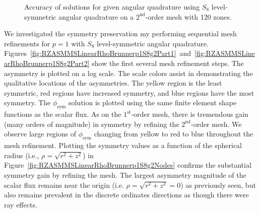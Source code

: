 \documentclass[12pt]{article}
\begin{document}
\begin{figure}[!htb]
\centering
{}
\caption{Accuracy of solutions for given angular quadrature using $S_8$ level-symmetric angular quadrature on a $2^\text{nd}$-order mesh with 120 zones.}
\label{fig:RZASMMSLinearRhoBrunnerS8g2r2Accuracy}
\end{figure}

\FloatBarrier

We investigated the symmetry preservation my performing sequential mesh refinements for $p=1$ with $S_8$ level-symmetric angular quadrature. Figures~\ref{fig:RZASMMSLinearRhoBrunnerp1S8g2Part1}~and~\ref{fig:RZASMMSLinearRhoBrunnerp1S8g2Part2} show the first several mesh refinement steps. The asymmetry is plotted on a log scale. The scale colors assist in demonstrating the qualitative locations of the asymmetries. The yellow region is the least symmetric, red regions have increased symmetry, and blue regions have the most symmetry. The $\phi_\text{sym}$ solution is plotted using the same finite element shape functions as the scalar flux. As on the $1^\text{st}$-order mesh, there is tremendous gain (many orders of magnitude) in symmetry by refining the $2^\text{nd}$-order mesh. We observe large regions of $\phi_\text{sym}$ changing from yellow to red to blue throughout the mesh refinement. Plotting the symmetry values as a function of the spherical radius (i.e., $\rho=\sqrt{r^2+z^2}$) in Figure~\ref{fig:RZASMMSLinearRhoBrunnerp1S8g2Nodes} confirms the substantial symmetry gain by refining the mesh. The largest asymmetry magnitude of the scalar flux remains near the origin (i.e. $\rho=\sqrt{r^2+z^2}=0$) as previously seen, but also remains prevalent in the discrete ordinates directions as though there were ray effects.
\end{document}
